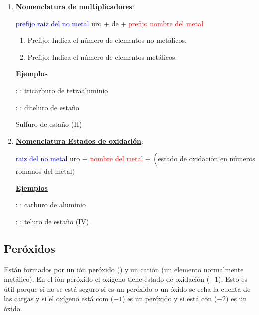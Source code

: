 \documentclass[11pt, a4paper]{article}
\begin{document}
\begin{enumerate}[label=\itembolascolor{\arabic*}{blue}]
    \item \textbf{\uline{Nomenclatura de multiplicadores}}:
          \begin{center}
              \textcolor{blue}{prefijo} \textcolor{blue}{raiz del no metal} \textcolor{mygreen}{uro} + de + \textcolor{red}{prefijo} \textcolor{red}{nombre del metal}
          \end{center}

          \begin{enumerate}[label=\textcolor{red}{$\bullet$}]
              \item Prefijo: Indica el número de elementos no metálicos.
              \item Prefijo: Indica el número de elementos metálicos.
          \end{enumerate}

          \textbf{\uline{Ejemplos}}

           : : tricarburo de tetraaluminio

           : : diteluro de estaño

          Sulfuro de estaño (II) \ch{->}   \ch{->}  \ch{->} 

    \item \textbf{\uline{Nomenclatura Estados de oxidación}}:
          \begin{center}
              \textcolor{blue}{raiz del no metal} \textcolor{mygreen}{uro}  + \textcolor{red}{nombre del metal} + $\Bigl($\textcolor{green!50!black}{estado de oxidación en números romanos del metal}$\Bigr)$
          \end{center}

          \textbf{\uline{Ejemplos}}

           : : carburo de aluminio

           : : teluro de estaño (IV)
\end{enumerate}

\subsection{Peróxidos}

Están formados por un ión peróxido () y un catión (un elemento normalmente metálico). En el ión peróxido el oxígeno tiene estado de oxidación ($-1$). Esto es útil porque si no se está seguro si es un peróxido o un óxido se echa la cuenta de las cargas y si el oxígeno está com ($-1$) es un peróxido y si está con ($-2$) es un óxido.
\end{document}
